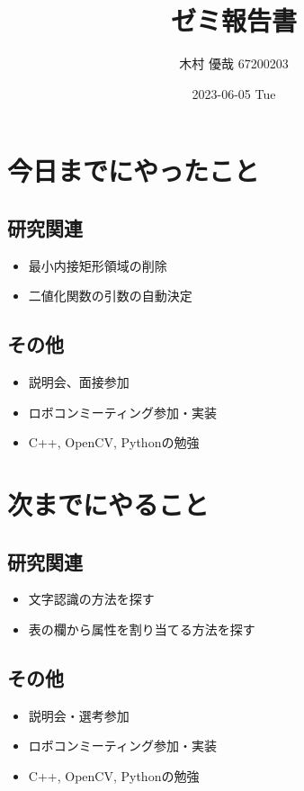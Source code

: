 \documentclass[uplatex, onecolumn, 10pt]{jsarticle}
\begin{document}
\title{\vspace{-40mm}\bf{\LARGE{ゼミ報告書}}}
\author{\vspace{-40mm}木村 優哉 67200203}
\date{2023-06-05 Tue}
\maketitle


\section{今日までにやったこと}

\subsection*{研究関連}
\begin{itemize}
	\item 最小内接矩形領域の削除
	\item 二値化関数の引数の自動決定
\end{itemize}

\subsection*{その他}
\begin{itemize}
	\item 説明会、面接参加
	\item ロボコンミーティング参加・実装
	\item C++, OpenCV, Pythonの勉強
\end{itemize}


\section{次までにやること}

\subsection*{研究関連}
\begin{itemize}
	\item 文字認識の方法を探す
	\item 表の欄から属性を割り当てる方法を探す
\end{itemize}

\subsection*{その他}
\begin{itemize}
	\item 説明会・選考参加
	\item ロボコンミーティング参加・実装
	\item C++, OpenCV, Pythonの勉強
\end{itemize}
\end{document}
